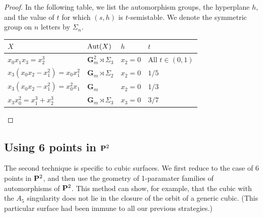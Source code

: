 \documentclass[12pt,reqno]{amsart}
\numberwithin{equation}{section}
\newcommand{\G}{\mathbf G}
\begin{document}
\begin{proof}
  In the following table, we list the automorphism groups, the hyperplane $h$, and the value of $t$ for which $(s,h)$ is $t$-semistable.
  We denote the symmetric group on $n$ letters by $\Sigma_n$.
  \begin{center}
  \begin{tabular}{l l l l}
    \toprule
    $X$ & $\Aut(X)$ & $h$ & $t$\\
    \midrule
    $x_0x_1x_3 = x_2^3$& $\G_m^2 \rtimes \Sigma_3$ & $x_2 = 0$ & All $t \in (0,1)$\\
    $x_3(x_0x_2-x_1^2) = x_0x_1^2$& $\G_m \rtimes \Sigma_2$ & $x_2 = 0$ & $1/5$ \\
    $x_3(x_0x_2-x_1^2) = x_0^2x_1$& $\G_m$ & $x_2 = 0$ & $1/3$\\
    $x_3x_0^2 = x_1^3 + x_2^3$& $\G_m \rtimes \Sigma_3$ & $x_3 = 0$ & $3/7$\\
    \bottomrule
  \end{tabular}
\end{center}
\end{proof}

\subsection{Using 6 points in $\P^2$}
The second technique is specific to cubic surfaces.
We first reduce to the case of 6 points in $\P^2$, and then use the geometry of 1-paramater families of automorphisms of $\P^2$.
This method can show, for example, that the cubic with the $A_5$ singularity does not lie in the closure of the orbit of a generic cubic.
(This particular surface had been immune to all our previous strategies.)
\end{document}
